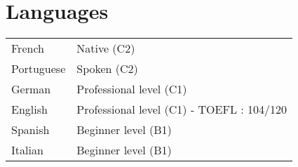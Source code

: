 \documentclass[a4paper,12pt]{article}
\begin{document}
\section{Languages}
\begin{tabularx}{\linewidth}{@{}l X@{}}
French &  \normalsize{Native (C2)}\\
Portuguese &  \normalsize{Spoken (C2)}\\
German &  \normalsize{Professional level (C1)}\\  
English &  \normalsize{Professional level (C1) - TOEFL : 104/120}\\ 
Spanish & \normalsize{Beginner level (B1)}\\ 
Italian & \normalsize{Beginner level (B1)}\\ 
\end{tabularx}

\vfill
{}
\end{document}
